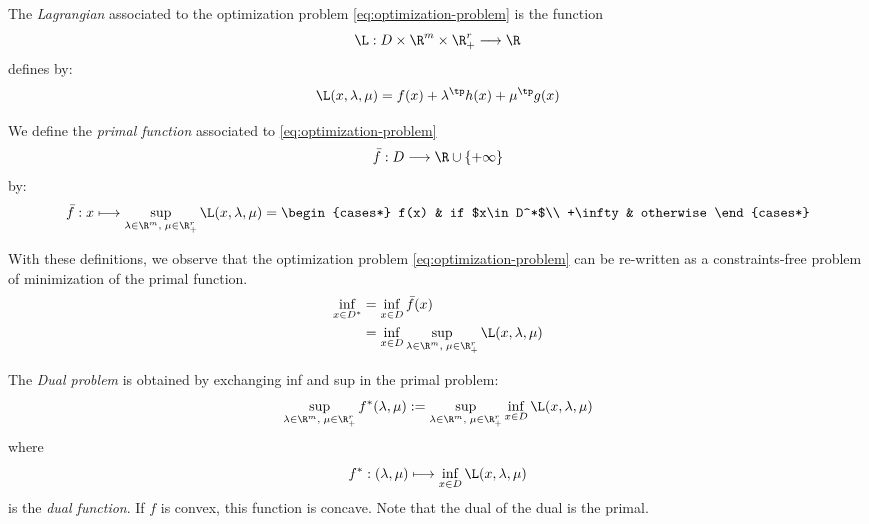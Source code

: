 \documentclass[toc, titlepaged]{../cs-classes/cs-classes}
\begin{document}
\begin{definition}[Lagrangian]
    The \emph{Lagrangian} associated to the optimization problem \eqref{eq:optimization-problem} is the function
    \begin{equation*}
        \L:D\times\R^m\times\R_+^r \longrightarrow \R
    \end{equation*}
    defines by:
    \begin{equation*}
        \L(x, \lambda, \mu) = f(x) + \lambda^\tp h(x) + \mu^\tp g(x)
    \end{equation*}
\end{definition}

\begin{definition}
    We define the \emph{primal function} associated to \eqref{eq:optimization-problem}
    \begin{equation*}
        \bar{f}:D\longrightarrow\R\cup\{+\infty\}
    \end{equation*}
    by:
    \begin{equation*}
        \bar{f} : x \longmapsto \sup_{\lambda\in\R^m, \;\mu\in\R^r_+} \L(x, \lambda, \mu) = \begin{cases*}
            f(x) & if $x\in D^*$\\
            +\infty & otherwise
        \end{cases*}
    \end{equation*}
\end{definition}

\begin{definition}
    With these definitions, we observe that the optimization problem \eqref{eq:optimization-problem} can be re-written as a constraints-free problem of minimization of the primal function.
    \begin{equation*}
        \begin{aligned}
            \inf_{x\in D^*} &= \inf_{x\in D}\bar{f}(x)\\
            &= \inf_{x\in D} \sup_{\lambda\in\R^m, \;\mu\in\R^r_+} \L(x, \lambda, \mu)
        \end{aligned}
    \end{equation*}
\end{definition}

\begin{definition}
    The \emph{Dual problem} is obtained by exchanging inf and sup in the primal problem:
    \begin{equation*}
        \sup_{\lambda\in\R^m, \;\mu\in\R^r_+} f^*(\lambda, \mu) := \sup_{\lambda\in\R^m, \;\mu\in\R^r_+} \inf_{x\in D}\L(x, \lambda, \mu)
    \end{equation*}
    where
    \begin{equation*}
        f^* : (\lambda, \mu) \longmapsto \inf_{x\in D}\L(x, \lambda, \mu)
    \end{equation*}
    is the \emph{dual function}. If $f$ is convex, this function is concave. Note that the dual of the dual is the primal.
\end{definition}
\end{document}
